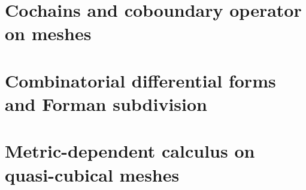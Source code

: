 \documentclass{article}
\theoremstyle{definition}
\begin{document}
\section{Cochains and coboundary operator on meshes}
\label{section:cochains_and_coboundary_operator_on_meshes}





\section{Combinatorial differential forms and Forman subdivision}
\label{section:combinatorial_differential_forms_and_forman_subdivision}




















\section{Metric-dependent calculus on quasi-cubical meshes}
\label{section:metric_dependent_calculus_on_quasi_cubical_meshes}










\end{document}
